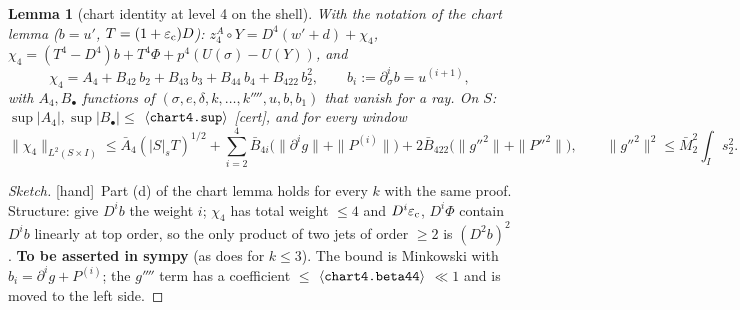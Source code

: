 \documentclass[11pt]{article}
\newtheorem{lemma}{Lemma}\newtheorem{proposition}{Proposition}\newtheorem{remark}{Remark}
\newcommand{\fn}[1]{\texttt{\detokenize{#1}}}
\newcommand{\cst}[1]{\ensuremath{\langle\texttt{\detokenize{#1}}\rangle}}
\newcommand{\tC}{\textup{[cert]}}\newcommand{\tH}{\textup{[hand]}}\newcommand{\tE}{\textup{[est]}}\newcommand{\tS}{\textup{[sym]}}
\begin{document}
\begin{lemma}[chart identity at level 4 on the shell]\label{F:lem:chart4}
With the notation of the chart lemma ($b=u'$, $T=(1+\varepsilon_{\rm c})D$): $z^A_4\circ Y=D^4(w'+d)+\chi_4$, $\chi_4=(T^4-D^4)b+T^4\Phi+p^4(U(\sigma)-U(Y))$, and
\[\chi_4=A_4+B_{42}\,b_2+B_{43}\,b_3+B_{44}\,b_4+B_{422}\,b_2^2,\qquad b_i:=\partial_\sigma^ib=u^{(i+1)},\]
with $A_4,B_\bullet$ functions of $(\sigma,e,\delta,k,\dots,k'''',u,b,b_1)$ that vanish for a ray. On $S$: $\sup|A_4|,\sup|B_\bullet|\le$ \cst{chart4.sup} \tC, and for every window
\[\|\chi_4\|_{L^2(S\times I)}\le\bar A_4(|S|_sT)^{1/2}+\sum_{i=2}^4\bar B_{4i}\bigl(\|\partial^ig\|+\|P^{(i)}\|\bigr)+2\bar B_{422}\bigl(\|g''^2\|+\|P''^2\|\bigr),\qquad\|g''^2\|^2\le\bar M_2^2\int_Is_2^2 .\]
\end{lemma}
\begin{proof}[Sketch]\tH\ Part (d) of the chart lemma holds for every $k$ with the same proof. Structure: give $D^ib$ the weight $i$; $\chi_4$ has total weight $\le4$ and $D^i\varepsilon_{\rm c}$, $D^i\Phi$ contain $D^ib$ linearly at top order, so the only product of two jets of order $\ge2$ is $(D^2b)^2$. \textbf{To be asserted in sympy} (as \fn{n1_chart.py} does for $k\le3$). The bound is Minkowski with $b_i=\partial^ig+P^{(i)}$; the $g''''$ term has a coefficient $\le$ \cst{chart4.beta44} $\ll1$ and is moved to the left side.
\end{proof}
\end{document}
